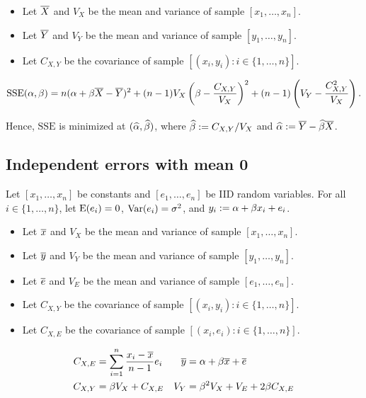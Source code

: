 \documentclass[a4paper, 12pt, fleqn]{article}
\newcommand*{\SSE}{\mathrm{SSE}}
\begin{document}
\begin{itemize}
\item Let $\overline{X}$ and $V_X$ be the mean and variance of sample $[x_1, \ldots, x_n]$.
\item Let $\overline{Y}$ and $V_Y$ be the mean and variance of sample $[y_1, \ldots, y_n]$.
\item Let $C_{X,Y}$ be the covariance of sample $[(x_i, y_i): i \in \{1, \ldots, n\}]$.
\end{itemize}

\begin{theorem}
\label{thm:sse-expand}
\[ \SSE(\alpha, \beta) = n(\alpha + \beta\Xbar - \Ybar)^2
    + (n-1)V_X\left(\beta - \frac{C_{X,Y}}{V_X}\right)^2
    + (n-1)\left(V_Y - \frac{C_{X,Y}^2}{V_X}\right). \]
\end{theorem}

Hence, $\SSE$ is minimized at $(\widehat{\alpha}, \widehat{\beta})$,
where $\widehat{\beta} := C_{X,Y}/V_X$ and $\widehat{\alpha} := \overline{Y} - \widehat{\beta}\overline{X}$.

\subsection{Independent errors with mean 0}

Let $[x_1, \ldots, x_n]$ be constants and $[e_1, \ldots, e_n]$ be IID random variables.
For all $i \in \{1, \ldots, n\}$, let
$\operatorname*{E}(e_i) = 0$, $\operatorname*{Var}(e_i) = \sigma^2$, and $y_i := \alpha + \beta x_i + e_i$.

\begin{itemize}
\item Let $\overline{x}$ and $V_X$ be the mean and variance of sample $[x_1, \ldots, x_n]$.
\item Let $\overline{y}$ and $V_Y$ be the mean and variance of sample $[y_1, \ldots, y_n]$.
\item Let $\overline{e}$ and $V_E$ be the mean and variance of sample $[e_1, \ldots, e_n]$.
\item Let $C_{X,Y}$ be the covariance of sample $[(x_i, y_i): i \in \{1, \ldots, n\}]$.
\item Let $C_{X,E}$ be the covariance of sample $[(x_i, e_i): i \in \{1, \ldots, n\}]$.
\end{itemize}

\begin{lemma}
\begin{align*}
C_{X,E} &= \sum_{i=1}^n \frac{x_i-\overline{x}}{n-1}e_i
& \overline{y} &= \alpha + \beta\overline{x} + \overline{e}
\\ C_{X,Y} &= \beta V_X + C_{X,E}
& V_Y &= \beta^2 V_X + V_E + 2\beta C_{X,E}
\end{align*}
\end{lemma}
\end{document}
